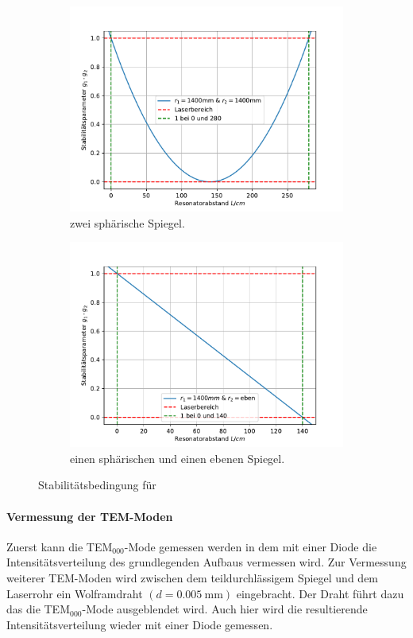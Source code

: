 \begin{figure}
 \begin{subfigure}{.48\textwidth}
  \centering
  \includegraphics[width = \textwidth]{plots/Vorbereitungsplot1.pdf}
  \caption{zwei sphärische Spiegel.}
  \label{fig:SSS}
\end{subfigure}
\begin{subfigure}{.48\textwidth}
  \centering
  \includegraphics[width = \textwidth]{plots/Vorbereitungsplot2.pdf}
  \caption{einen sphärischen und einen ebenen Spiegel.}
  \label{fig:SSE}
\end{subfigure}
\caption{Stabilitätsbedingung für}
  \label{fig:Stabi}
\end{figure}
\FloatBarrier
\paragraph{Vermessung der TEM-Moden} 
Zuerst kann die TEM$_{000}$-Mode gemessen werden in dem mit einer Diode die Intensitätsverteilung 
des grundlegenden Aufbaus vermessen wird. 
Zur Vermessung weiterer TEM-Moden wird zwischen dem teildurchlässigem Spiegel und dem Laserrohr 
ein Wolframdraht $(d= \SI{0.005}{\milli\meter})$ eingebracht. Der Draht führt dazu das die 
TEM$_{000}$-Mode ausgeblendet wird. Auch hier wird die resultierende Intensitätsverteilung wieder 
mit einer Diode gemessen. 
